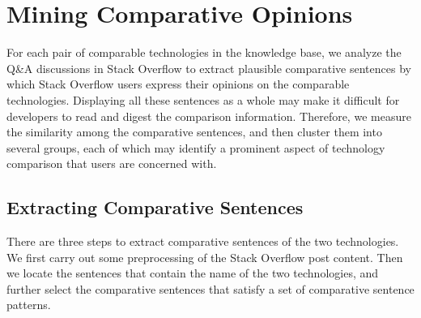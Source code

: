 \section{Mining Comparative Opinions}





For each pair of comparable technologies in the knowledge base, we analyze the Q\&A discussions in Stack Overflow to extract plausible comparative sentences by which Stack Overflow users express their opinions on the comparable technologies. 
Displaying all these sentences as a whole may make it difficult for developers to read and digest the comparison information.
Therefore, we measure the similarity among the comparative sentences, and then cluster them into several groups, each of which may identify a prominent aspect of technology comparison that users are concerned with.

\subsection{Extracting Comparative Sentences}
\label{sec:comparativeSentence}

There are three steps to extract comparative sentences of the two technologies.
We first carry out some preprocessing of the Stack Overflow post content.
Then we locate the sentences that contain the name of the two technologies, and further select the comparative sentences that satisfy a set of comparative sentence patterns.

